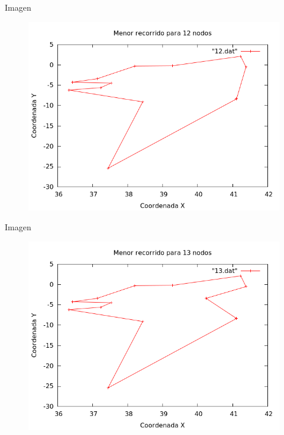 \begin{frame}
	\begin{exampleblock}{Imagen}
	\begin{figure}[H]
    \centering
    \includegraphics[scale=0.35]{../TSP/Graficas/12.png}
	\end{figure}
	\end{exampleblock}
\end{frame}

\begin{frame}
	\begin{exampleblock}{Imagen}
	\begin{figure}[H]
    \centering
    \includegraphics[scale=0.35]{../TSP/Graficas/13.png}
	\end{figure}
	\end{exampleblock}
\end{frame}




